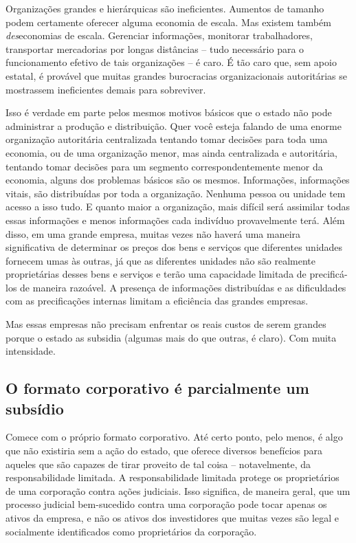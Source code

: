 Organizações grandes e hierárquicas são ineficientes. Aumentos de tamanho podem certamente oferecer alguma economia de escala. Mas existem também \emph{des}economias de escala. Gerenciar informações, monitorar trabalhadores, transportar mercadorias por longas distâncias -- tudo necessário para o funcionamento efetivo de tais organizações -- é caro. É tão caro que, sem apoio estatal, é provável que muitas grandes burocracias organizacionais autoritárias se mostrassem ineficientes demais para sobreviver.

Isso é verdade em parte pelos mesmos motivos básicos que o estado não pode administrar a produção e distribuição. Quer você esteja falando de uma enorme organização autoritária centralizada tentando tomar decisões para toda uma economia, ou de uma organização menor, mas ainda centralizada e autoritária, tentando tomar decisões para um segmento correspondentemente menor da economia, alguns dos problemas básicos são os mesmos. Informações, informações vitais, são distribuídas por toda a organização. Nenhuma pessoa ou unidade tem acesso a isso tudo. E quanto maior a organização, mais difícil será assimilar todas essas informações e menos informações cada indivíduo provavelmente terá. Além disso, em uma grande empresa, muitas vezes não haverá uma maneira significativa de determinar os preços dos bens e serviços que diferentes unidades fornecem umas às outras, já que as diferentes unidades não são realmente proprietárias desses bens e serviços e terão uma capacidade limitada de precificá-los de maneira razoável. A presença de informações distribuídas e as dificuldades com as precificações internas limitam a eficiência das grandes empresas.

Mas essas empresas não precisam enfrentar os reais custos de serem grandes porque o estado as subsidia (algumas mais do que outras, é claro). Com muita intensidade.

\subsection*{O formato corporativo é parcialmente um subsídio}

Comece com o próprio formato corporativo. Até certo ponto, pelo menos, é algo que não existiria sem a ação do estado, que oferece diversos benefícios para aqueles que são capazes de tirar proveito de tal coisa -- notavelmente, da responsabilidade limitada. A responsabilidade limitada protege os proprietários de uma corporação contra ações judiciais. Isso significa, de maneira geral, que um processo judicial bem-sucedido contra uma corporação pode tocar apenas os ativos da empresa, e não os ativos dos investidores que muitas vezes são legal e socialmente identificados como proprietários da corporação.

